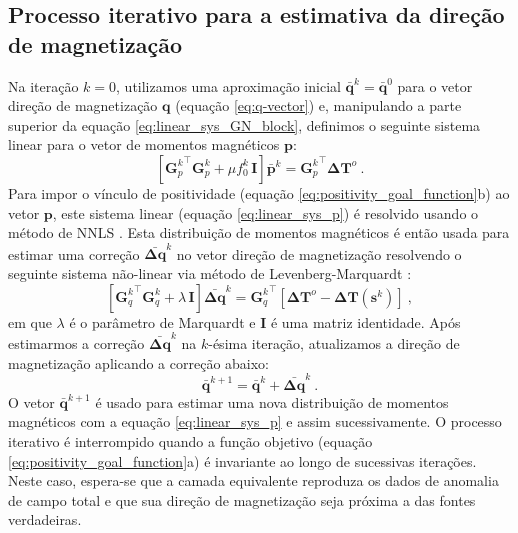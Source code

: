 \subsection{Processo iterativo para a estimativa da direção de magnetização}
\label{subsec:iterative-proccess}

Na iteração $k=0$, utilizamos uma aproximação inicial $\bar{\mathbf{q}}^{k} = \bar{\mathbf{q}}^{0}$ 
para o vetor direção de magnetização $\mathbf{q}$ (equação \ref{eq:q-vector}) e, manipulando a 
parte superior da equação \ref{eq:linear_sys_GN_block}, definimos o seguinte sistema linear 
para o vetor de momentos magnéticos $\mathbf{p}$:
\begin{equation}
\left[ {\mathbf{G}_{p}^{k}}^{\top} \mathbf{G}_{p}^{k} + 
\mu f_{0}^{k} \, \mathbf{I} \right] \bar{\mathbf{p}}^{k} = 
{\mathbf{G}_{p}^{k}}^{\top} \mathbf{\Delta T}^{o} \: .
\label{eq:linear_sys_p}
\end{equation}
Para impor o vínculo de positividade (equação \ref{eq:positivity_goal_function}b) ao vetor $\mathbf{p}$, este sistema 
linear (equação \ref{eq:linear_sys_p}) é resolvido usando o método de NNLS \citep{lawson_hanson_1974, silvadias_etal_2010}. 
Esta distribuição de momentos magnéticos é então usada para estimar uma correção $\bar{\mathbf{\Delta q}}^{k}$ no vetor 
direção de magnetização resolvendo o seguinte sistema não-linear via método de Levenberg-Marquardt 
\citep{aster2005}:
\begin{equation}
\left[ {\mathbf{G}_{q}^{k}}^{\top} \mathbf{G}_{q}^{k} + \lambda \, \mathbf{I} \right] 
\bar{\mathbf{\Delta q}}^{k} = {\mathbf{G}_{q}^{k}}^{\top} 
\left[ \mathbf{\Delta T}^{o} - \mathbf{\Delta T} (\mathbf{s}^{k}) \right] \: ,
\label{eq:linear_sys_q}
\end{equation}
em que $\lambda$ é o parâmetro de Marquardt e $\mathbf{I}$ é uma matriz identidade. Após estimarmos a correção 
$\bar{\mathbf{\Delta q}}^{k}$ na $k$-ésima iteração, atualizamos a direção de magnetização 
aplicando a correção abaixo:
\begin{equation}
\bar{\mathbf{q}}^{k+1} = \bar{\mathbf{q}}^{k} + \bar{\mathbf{\Delta q}}^{k} \: .
\label{eq:q_next}
\end{equation}
O vetor $\bar{\mathbf{q}}^{k+1}$ é usado para estimar uma nova distribuição de momentos magnéticos com a equação 
\ref{eq:linear_sys_p} e assim sucessivamente. O processo iterativo é interrompido quando a função objetivo 
(equação \ref{eq:positivity_goal_function}a) é invariante ao longo de sucessivas iterações. Neste 
caso, espera-se que a camada equivalente reproduza os dados de anomalia de campo total e 
que sua direção de magnetização seja próxima a das fontes verdadeiras.

